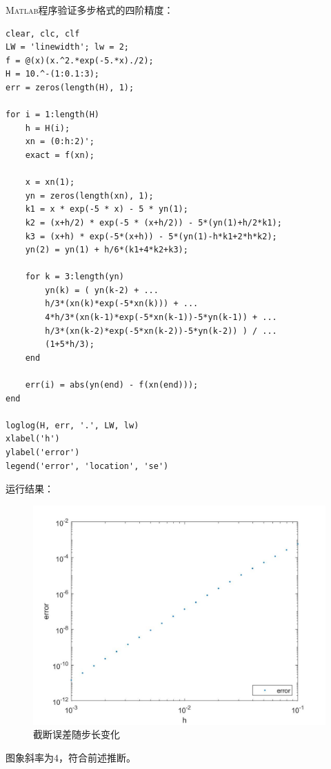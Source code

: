 \documentclass[12pt,a4paper,utf8]{ctexart}
\begin{document}
\begin{enumerate}
\textsc{Matlab}程序验证多步格式的四阶精度：
\begin{lstlisting}[frame=single]
clear, clc, clf
LW = 'linewidth'; lw = 2;
f = @(x)(x.^2.*exp(-5.*x)./2);
H = 10.^-(1:0.1:3);
err = zeros(length(H), 1);

for i = 1:length(H)
    h = H(i);
    xn = (0:h:2)';
    exact = f(xn);

    x = xn(1);
    yn = zeros(length(xn), 1);
    k1 = x * exp(-5 * x) - 5 * yn(1);
    k2 = (x+h/2) * exp(-5 * (x+h/2)) - 5*(yn(1)+h/2*k1);
    k3 = (x+h) * exp(-5*(x+h)) - 5*(yn(1)-h*k1+2*h*k2);
    yn(2) = yn(1) + h/6*(k1+4*k2+k3);

    for k = 3:length(yn)
        yn(k) = ( yn(k-2) + ...
        h/3*(xn(k)*exp(-5*xn(k))) + ...
        4*h/3*(xn(k-1)*exp(-5*xn(k-1))-5*yn(k-1)) + ...
        h/3*(xn(k-2)*exp(-5*xn(k-2))-5*yn(k-2)) ) / ...
        (1+5*h/3);
    end

    err(i) = abs(yn(end) - f(xn(end)));
end

loglog(H, err, '.', LW, lw)
xlabel('h')
ylabel('error')
legend('error', 'location', 'se')
\end{lstlisting}

运行结果：

\begin{figure}[H]
    \centering
    \includegraphics[width = .8\textwidth]{3.jpg}
    \caption{截断误差随步长变化}
\end{figure}
图象斜率为$4$，符合前述推断。

\end{enumerate}
\end{document}

